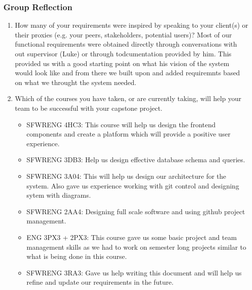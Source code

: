 \subsubsection*{Group Reflection}
\begin{enumerate}
  \item How many of your requirements were inspired by speaking to your client(s) or their proxies (e.g. your peers, stakeholders, potential users)?
  Most of our functional requirements were obtained directly through conversations with out supervisor (Luke) or through todcumentation provided by him. This provided us with a good starting point on what his vision of the system would look like and from there we built upon and added requiremnts based on what we throught the system needed.

  \item Which of the courses you have taken, or are currently taking, will help your team to be successful with your capstone project.
  \begin{itemize}
      \item SFWRENG 4HC3: This course will help us design the frontend components and create a platform which will provide a positive user experience.
      \item SFWRENG 3DB3: Help us design effective database schema and queries.
      \item SFWRENG 3A04: This will help us design our architecture for the system. Also gave us experience working with git control and designing sytem with diagrams.
      \item SFWRENG 2AA4: Designing full scale software and using github project management.
      \item ENG 3PX3 + 2PX3: This course gave us some basic project and team management skills as we had to work on semester long projects similar to what is being done in this course.
      \item SFWRENG 3RA3: Gave us help writing this document and will help us refine and update our requirements in the future.
  \end{itemize}


\end{enumerate}
